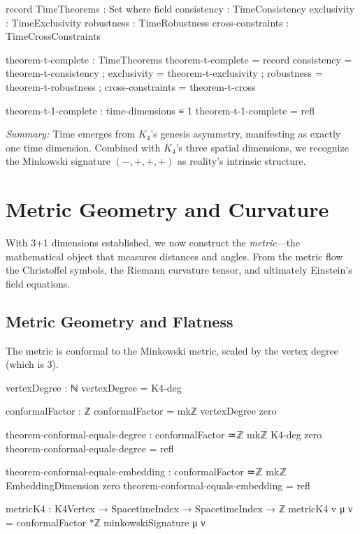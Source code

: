 \documentclass[11pt,a4paper]{book}
\begin{document}
\begin{code}
record TimeTheorems : Set where
  field
    consistency       : TimeConsistency
    exclusivity       : TimeExclusivity
    robustness        : TimeRobustness
    cross-constraints : TimeCrossConstraints

theorem-t-complete : TimeTheorems
theorem-t-complete = record
  { consistency       = theorem-t-consistency
  ; exclusivity       = theorem-t-exclusivity
  ; robustness        = theorem-t-robustness
  ; cross-constraints = theorem-t-cross
  }

theorem-t-1-complete : time-dimensions ≡ 1
theorem-t-1-complete = refl
\end{code}

\medskip
\noindent\textit{Summary:} Time emerges from $K_4$'s genesis asymmetry, manifesting as exactly one time dimension. Combined with $K_4$'s three spatial dimensions, we recognize the Minkowski signature $(-,+,+,+)$ as reality's intrinsic structure.


\chapter{Metric Geometry and Curvature}
\label{chap:metric-curvature}

With 3+1 dimensions established, we now construct the \emph{metric}—the mathematical 
object that measures distances and angles. From the metric flow the Christoffel symbols, 
the Riemann curvature tensor, and ultimately Einstein's field equations.

\section{Metric Geometry and Flatness}

The metric is conformal to the Minkowski metric, scaled by the vertex degree (which is 3).

\begin{code}
vertexDegree : ℕ
vertexDegree = K4-deg

conformalFactor : ℤ
conformalFactor = mkℤ vertexDegree zero

theorem-conformal-equals-degree : conformalFactor ≃ℤ mkℤ K4-deg zero
theorem-conformal-equals-degree = refl

theorem-conformal-equals-embedding : conformalFactor ≃ℤ mkℤ EmbeddingDimension zero
theorem-conformal-equals-embedding = refl

metricK4 : K4Vertex → SpacetimeIndex → SpacetimeIndex → ℤ
metricK4 v μ ν = conformalFactor *ℤ minkowskiSignature μ ν
\end{code}
\end{document}
